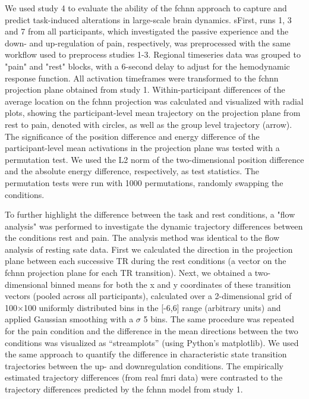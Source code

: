 \documentclass{article}
\begin{document}
We used study 4 to evaluate the ability of the \acrshort{fchnn} approach to capture and predict task-induced alterations in large-scale brain dynamics.
sFirst, runs 1, 3 and 7 from all participants, which investigated the passive experience and the down- and up-regulation of pain, respectively, was preprocessed with the same workflow used to preprocess studies 1-3. Regional timeseries data was grouped to "pain" and "rest" blocks, with a 6-second delay to adjust for the hemodynamic response function. All activation timeframes were transformed to the \acrshort{fchnn} projection plane obtained from study 1. Within-participant differences of the average location on the \acrshort{fchnn} projection was calculated and visualized with radial plots, showing the participant-level mean trajectory on the projection plane from rest to pain, denoted with circles, as well as the group level trajectory (arrow). The significance of the position difference and energy difference of the participant-level mean activations in the projection plane was tested with a permutation test. We used the L2 norm of the two-dimensional position difference and the absolute energy difference, respectively, as test statistics. The permutation tests were run with 1000 permutations, randomly swapping the conditions.

To further highlight the difference between the task and rest conditions, a "flow analysis" was performed to investigate the dynamic trajectory differences between the conditions rest and pain. The analysis method was identical to the flow analysis of resting sate data. First we calculated the direction in the projection plane between each successive TR during the rest conditions (a vector on the \acrshort{fchnn} projection plane for each TR transition). Next, we obtained a two-dimensional binned means for both the x and y coordinates of these transition vectors (pooled across all participants), calculated over a 2-dimensional grid of 100$\times$100 uniformly distributed bins in the [-6,6] range (arbitrary units) and applied Gaussian smoothing with a $\sigma$ 5 bins.
The same procedure was repeated for the pain condition and the difference in the mean directions between the two conditions was visualized as ``streamplots'' (using Python's matplotlib). We used the same approach to quantify the difference in characteristic state transition trajectories between the up- and downregulation conditions. The empirically estimated trajectory differences (from real \acrshort{fmri} data) were contrasted to the trajectory differences predicted by the \acrshort{fchnn} model from study 1.
\end{document}

